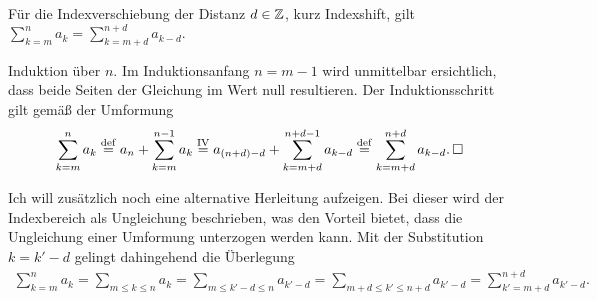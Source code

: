 \begin{Satz}[Indexverschiebung]%
\label{Summe-Indexshift}\newlinefirst
Für die Indexverschiebung der Distanz $d\in\mathbb Z$,
kurz Indexshift, gilt\\
$\sum_{k=m}^n a_k = \sum_{k=m+d}^{n+d} a_{k-d}.$
\end{Satz}
\begin{Beweis}
Induktion über $n$. Im Induktionsanfang $n=m-1$ wird unmittelbar
ersichtlich, dass beide Seiten der Gleichung im Wert null resultieren.
Der Induktionsschritt gilt gemäß der Umformung%
\begin{align*}
\sum_{k=m}^n a_k \stackrel{\mathrm{def}}= a_n+\sum_{k=m}^{n-1} a_k
\stackrel{\mathrm{IV}}= a_{(n+d)-d}+\sum_{k=m+d}^{n+d-1} a_{k-d}
\stackrel{\mathrm{def}}= \sum_{k=m+d}^{n+d} a_{k-d}.\,\Box
\end{align*}
\end{Beweis}

\noindent
Ich will zusätzlich noch eine alternative Herleitung aufzeigen. Bei
dieser wird der Indexbereich als Ungleichung beschrieben, was den
Vorteil bietet, dass die Ungleichung einer Umformung unterzogen werden
kann. Mit der Substitution $k=k'-d$ gelingt dahingehend die Überlegung%
\begin{align*}
\sum_{k=m}^n a_k = \sum_{m\le k\le n} a_k
= \!\!\sum_{m\le k'-d\le n}\!\! a_{k'-d}
= \!\!\sum_{m+d\le k'\le n+d}\!\! a_{k'-d}
= \sum_{k'=m+d}^{n+d} a_{k'-d}.
\end{align*}


